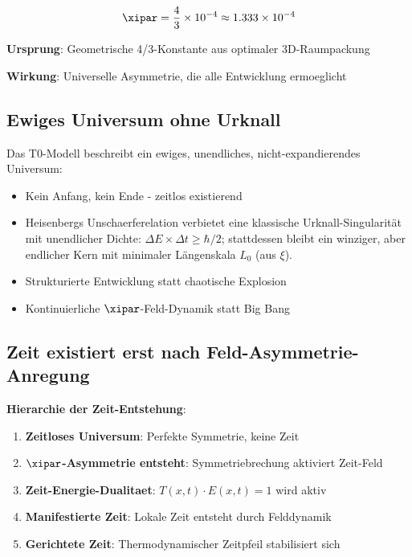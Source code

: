 	\begin{equation}
		\xipar = \frac{4}{3} \times 10^{-4} \approx 1.333 \times 10^{-4}
	\end{equation}
	
	\textbf{Ursprung}: Geometrische 4/3-Konstante aus optimaler 3D-Raumpackung
	
	\textbf{Wirkung}: Universelle Asymmetrie, die alle Entwicklung ermoeglicht
	
	\subsection{Ewiges Universum ohne Urknall}
	
	Das T0-Modell beschreibt ein ewiges, unendliches, nicht-expandierendes Universum:
	
	\begin{itemize}
		\item Kein Anfang, kein Ende - zeitlos existierend
		\item Heisenbergs Unschaerferelation verbietet eine klassische Urknall-Singularität mit unendlicher Dichte: $\Delta E \times \Delta t \geq \hbar/2$; stattdessen bleibt ein winziger, aber endlicher Kern mit minimaler Längenskala $L_0$ (aus $\xi$).
		\item Strukturierte Entwicklung statt chaotische Explosion
		\item Kontinuierliche $\xipar$-Feld-Dynamik statt Big Bang
	\end{itemize}
	
	\subsection{Zeit existiert erst nach Feld-Asymmetrie-Anregung}
	
	\textbf{Hierarchie der Zeit-Entstehung}:
	\begin{enumerate}
		\item \textbf{Zeitloses Universum}: Perfekte Symmetrie, keine Zeit
		\item \textbf{$\xipar$-Asymmetrie entsteht}: Symmetriebrechung aktiviert Zeit-Feld
		\item \textbf{Zeit-Energie-Dualitaet}: $T(x,t) \cdot E(x,t) = 1$ wird aktiv
		\item \textbf{Manifestierte Zeit}: Lokale Zeit entsteht durch Felddynamik
		\item \textbf{Gerichtete Zeit}: Thermodynamischer Zeitpfeil stabilisiert sich
	\end{enumerate}
	
